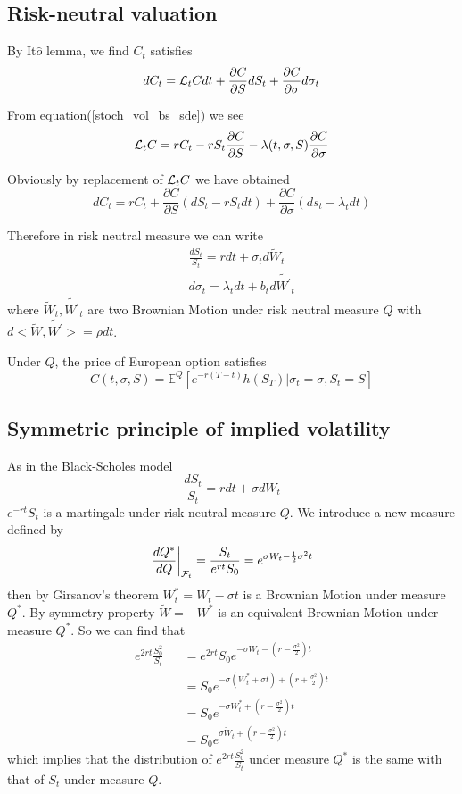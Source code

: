 \documentclass[10pt]{article}
\theoremstyle{plain}
\numberwithin{equation}{section}
\numberwithin{table}{section}
\newcommand{\s}{\sigma}
\newcommand{\prt}[1]{\left( #1 \right)}  %
\newcommand{\pa}{\partial}
\newcommand{\E}{\mathbb{E}}
\begin{document}
\subsection{Risk-neutral valuation} 
By It$\hat{o}$ lemma, we find $C_t$ satisfies
\[
    dC_t = {\cal{L}}_t C dt + \frac{\pa C}{ \pa S}dS_t + \frac{\pa C}{ \pa \s}d\s_t   
\]

From equation(\ref{stoch_vol_bs_sde}) we see
\[
    {\cal{L}}_t C =  rC_t - rS_t \frac{\pa C}{\pa S} - \lambda(t, \s, S) \frac{\pa C}{\pa \s}
\]

Obviously by replacement of ${\cal{L}}_t C$ we have obtained
\[
    dC_t = rC_t+   \frac{\pa C}{\pa S} \prt{dS_t - rS_t dt} + \frac{\pa C}{\pa \s} \prt{ds_t - \lambda_t dt}
\]

Therefore in risk neutral measure we can write
\begin{eqnarray*}
    && \frac{dS_t}{S_t} = rdt + \s_t d \tilde{W}_t \\
    && d\s_t = \lambda_t dt + b_t  d \tilde{W^{'}}_t
\end{eqnarray*} 
where $\tilde{W}_t, \tilde{W^{'}}_t$ are two Brownian Motion under risk neutral measure $Q$ 
with $d<\tilde{W}, \tilde{W^{'}}>=\rho dt$.

Under $Q$, the price of European option satisfies
\[
    C(t, \s, S)  = \E^Q [e^{-r(T-t)} h(S_T) \vert  \s_t=\s, S_t=S ]    
\]


\subsection{Symmetric principle of implied volatility}
As in the Black-Scholes model 
\[
    \frac{dS_t}{S_t} = rdt + \s dW_t   
\]
$e^{-rt}S_t$ is a martingale under risk neutral measure $Q$. We introduce a new measure defined by
\[
    \left.\frac{dQ^*}{dQ}\right|_{{\cal F}_t} = \frac{S_t}{e^{rt}S_0}=e^{\s W_t - \frac{1}{2}\s^2 t}
\]
then by Girsanov's theorem $W^*_t = W_t - \s t$ is a Brownian Motion under measure $Q^*$. By symmetry property $\tilde{W}=-W^*$ is an equivalent Brownian Motion
under measure $Q^*$. So we can find that 
\begin{eqnarray*}
    e^{2rt}\frac{S^2_0}{S_t} &&= e^{2rt}S_0 e^{-\s W_t - (r-\frac{\s^2}{2})t} \\
    && = S_0 e^{-\s (W^*_t + \s t) + (r+\frac{\s^2}{2})t}\\
    && = S_0  e^{-\s W^*_t +(r-\frac{\s^2}{2})t} \\
    && = S_0  e^{\s \tilde{W}_t +(r-\frac{\s^2}{2})t}
\end{eqnarray*} 
which implies that the distribution of $e^{2rt}\frac{S^2_0}{S_t}$ under measure $Q^*$ is the same with that of $S_t$ under measure 
$Q$. 
\end{document}

